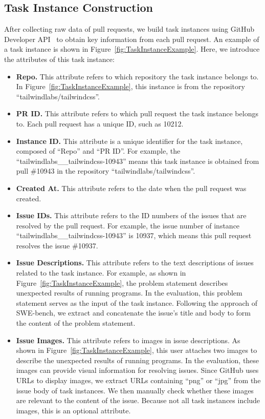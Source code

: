\subsection{Task Instance Construction}
After collecting raw data of pull requests, we build task instances using GitHub Developer API~\cite{github-rest-api} to obtain key information from each pull request. An example of a task instance is shown in Figure~\ref{fig:TaskInstanceExample}. Here, we introduce the attributes of this task instance:

\begin{itemize}[left=10pt]
    \item \textbf{Repo.} This attribute refers to which repository the task instance belongs to. In Figure~\ref{fig:TaskInstanceExample}, this instance is from the repository ``tailwindlabs/tailwindcss''. 
    \item \textbf{PR ID.} This attribute refers to which pull request the task instance belongs to. Each pull request has a unique ID, such as 10212.
    \item  \textbf{Instance ID.} This attribute is a unique identifier for the task instance, composed of ``Repo'' and ``PR ID''. For example, the ``tailwindlabs\_\_tailwindcss-10943'' means this task instance is obtained from pull \#10943 in the repository ``tailwindlabs/tailwindcss''.
    \item  \textbf{Created At.} This attribute refers to the date when the pull request was created.
    \item \textbf{Issue IDs.} This attribute refers to the ID numbers of the issues that are resolved by the pull request. For example, the issue number of instance ``tailwindlabs\_\_tailwindcss-10943'' is 10937, which means this pull request resolves the issue \#10937.
    \item \textbf{Issue Descriptions.} This attribute refers to the text descriptions of issues related to the task instance. For example, as shown in Figure~\ref{fig:TaskInstanceExample}, the problem statement describes unexpected results of running programs. In the evaluation, this problem statement serves as the input of the task instance. Following the approach of  SWE-bench, we extract and concatenate the issue's title and body to form the content of the problem statement.
    \item \textbf{Issue Images.} This attribute refers to images in issue descriptions.  As shown in Figure~\ref{fig:TaskInstanceExample}, this user attaches two images to describe the unexpected results of running programs. In the evaluation, these images can provide visual information for resolving issues. Since GitHub uses URLs to display images, we extract URLs containing ``png'' or ``jpg'' from the issue body of task instances. We then manually check whether these images are relevant to the content of the issue. Because not all task instances include images, this is an optional attribute.

\end{itemize}

